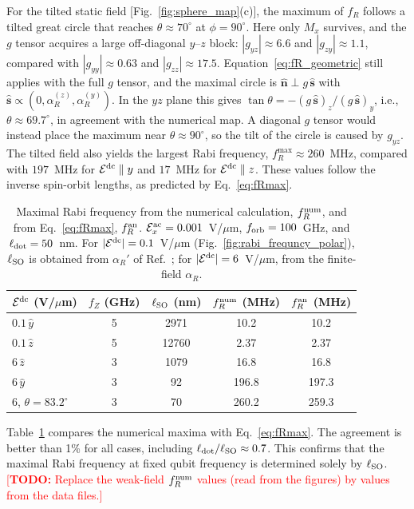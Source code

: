 \documentclass[
  aps,
  reprint,
  amsmath,
  amssymb,
  groupedaddress,
  floatfix,
  longbibliography,
]{revtex4-2}
\newcommand{\todo}[1]{\textcolor{red}{[\textbf{TODO:} #1]}}
\newcommand{\Eac}{\mathcal{E}^{\rm ac}_x}
\newcommand{\Edc}{\mathcal{E}^{\rm dc}}
\newcommand{\ldot}{\ell_{\rm dot}}
\newcommand{\lso}{\ell_{\rm SO}}
\newcommand{\nhat}{\hat{\mathbf n}}
\newcommand{\shat}{\hat{\mathbf s}}
\begin{document}
For the tilted static field [Fig.~\ref{fig:sphere_map}(c)], the maximum of $f_R$ follows a tilted great circle that reaches $\theta\approx70^\circ$ at $\phi=90^\circ$. Here only $M_x$ survives, and the $g$ tensor acquires a large off-diagonal $y$--$z$ block: $|g_{yz}|\approx6.6$ and $|g_{zy}|\approx1.1$, compared with $|g_{yy}|\approx0.63$ and $|g_{zz}|\approx17.5$. Equation~\eqref{eq:fR_geometric} still applies with the full $g$ tensor, and the maximal circle is $\nhat\perp g\,\shat$ with $\shat\propto(0,\alpha_R^{(z)},\alpha_R^{(y)})$. In the $yz$ plane this gives $\tan\theta=-(g\,\shat)_z/(g\,\shat)_y$, i.e., $\theta\approx69.7^\circ$, in agreement with the numerical map. A diagonal $g$ tensor would instead place the maximum near $\theta\approx90^\circ$, so the tilt of the circle is caused by $g_{yz}$.
The tilted field also yields the largest Rabi frequency, $f_R^{\max}\approx260$~MHz, compared with $197$~MHz for $\Edc\parallel y$ and $17$~MHz for $\Edc\parallel z$. These values follow the inverse spin-orbit lengths, as predicted by Eq.~\eqref{eq:fRmax}.

\begin{table}[t]
\caption{Maximal Rabi frequency from the numerical calculation, $f_R^{\rm num}$, and from Eq.~\eqref{eq:fRmax}, $f_R^{\rm an}$. $\Eac=0.001$~V/$\mu$m, $f_{\rm orb}=100$~GHz, and $\ldot=50$~nm. For $|\Edc|=0.1$~V/$\mu$m (Fig.~\ref{fig:rabi_frequncy_polar}), $\lso$ is obtained from $\alpha_R'$ of Ref.~\cite{das2026anisotropic}; for $|\Edc|=6$~V/$\mu$m, from the finite-field $\alpha_R$.}
\label{tab:fR_check}
\begin{ruledtabular}
\begin{tabular}{lcccc}
$\Edc$ (V/$\mu$m) & $f_Z$ (GHz) & $\lso$ (nm) & $f_R^{\rm num}$ (MHz) & $f_R^{\rm an}$ (MHz)\\
\hline
$0.1\,\hat y$ & 5 & 2971 & 10.2 & 10.2\\
$0.1\,\hat z$ & 5 & 12760 & 2.37 & 2.37\\
$6\,\hat z$ & 3 & 1079 & 16.8 & 16.8\\
$6\,\hat y$ & 3 & 92 & 196.8 & 197.3\\
$6$, $\theta=83.2^\circ$ & 3 & 70 & 260.2 & 259.3\\
\end{tabular}
\end{ruledtabular}
\end{table}

Table~\ref{tab:fR_check} compares the numerical maxima with Eq.~\eqref{eq:fRmax}. The agreement is better than 1\% for all cases, including $\ldot/\lso\approx0.7$. This confirms that the maximal Rabi frequency at fixed qubit frequency is determined solely by $\lso$.
\todo{Replace the weak-field $f_R^{\rm num}$ values (read from the figures) by values from the data files.}
\end{document}
